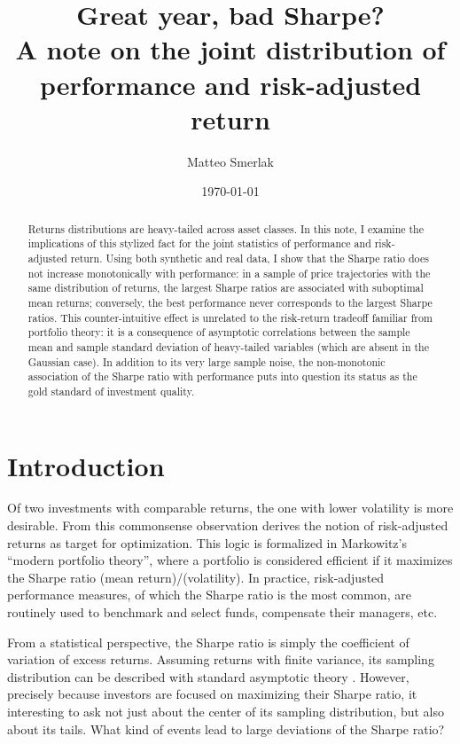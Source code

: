 \documentclass[
reprint,
amsmath,amssymb,
aps,
]{revtex4-2}
\begin{document}
\title{Great year, bad Sharpe?\\ A note on the joint distribution of performance and risk-adjusted return}

\author{Matteo Smerlak}

\date{\today}

\begin{abstract}
    Returns distributions are heavy-tailed across asset classes. 
    In this note, I examine the implications of this stylized fact for the joint statistics of performance and risk-adjusted return. 
    Using both synthetic and real data, I show that the Sharpe ratio does not increase monotonically with performance: in a sample of price trajectories with the same distribution of returns, the largest Sharpe ratios are associated with suboptimal mean returns; conversely, the best performance never corresponds to the largest Sharpe ratios. 
    This counter-intuitive effect is unrelated to the risk-return tradeoff familiar from portfolio theory: it is a consequence of asymptotic correlations between the sample mean and sample standard deviation of heavy-tailed variables (which are absent in the Gaussian case). 
    In addition to its very large sample noise, the non-monotonic association of the Sharpe ratio with performance puts into question its status as the gold standard of investment quality. 
 \end{abstract}

\maketitle 

\section{Introduction}

Of two investments with comparable returns, the one with lower volatility is more desirable. 
From this commonsense observation derives the notion of risk-adjusted returns as target for optimization. 
This logic is formalized in Markowitz's ``modern portfolio theory'', where a portfolio is considered efficient if it maximizes the Sharpe ratio (mean return)/(volatility). 
In practice, risk-adjusted performance measures, of which the Sharpe ratio is the most common, are routinely used to benchmark and select funds, compensate their managers, etc.

From a statistical perspective, the Sharpe ratio is simply the coefficient of variation of excess returns. 
Assuming returns with finite variance, its sampling distribution can be described with standard asymptotic theory \cite{loStatistics2002}. 
However, precisely because investors are focused on maximizing their Sharpe ratio, it interesting to ask not just about the center of its sampling distribution, but also about its tails. 
What kind of events lead to large deviations of the Sharpe ratio? 
\end{document}
